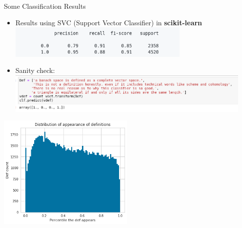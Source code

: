 \documentclass[10pt]{beamer}
\begin{document}
\begin{frame}{Some Classification Results}
    \begin{itemize}
        \item Results using SVC (Support Vector Classifier) in \textbf{scikit-learn}
    \includegraphics[width=0.7\textwidth]{class_results_svc.png}
    \item Sanity check:
    \includegraphics[width=0.95\textwidth]{sanity_check.png}
    \end{itemize}
    \begin{center}
     \includegraphics[width=0.5\textwidth]{def_appear_hist.png}
    \end{center}
\end{frame}
\end{document}
